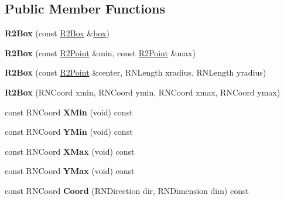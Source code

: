 \subsection*{Public Member Functions}
\begin{DoxyCompactItemize}
\item 
{\bfseries R2\+Box} (const \hyperlink{class_r2_box}{R2\+Box} \&\hyperlink{structbox}{box})\hypertarget{class_r2_box_a127e292224b01bcdce432230427a939a}{}\label{class_r2_box_a127e292224b01bcdce432230427a939a}

\item 
{\bfseries R2\+Box} (const \hyperlink{class_r2_point}{R2\+Point} \&min, const \hyperlink{class_r2_point}{R2\+Point} \&max)\hypertarget{class_r2_box_a83ae8c3cf4ee60fbb8fd9d979306aa6d}{}\label{class_r2_box_a83ae8c3cf4ee60fbb8fd9d979306aa6d}

\item 
{\bfseries R2\+Box} (const \hyperlink{class_r2_point}{R2\+Point} \&center, R\+N\+Length xradius, R\+N\+Length yradius)\hypertarget{class_r2_box_a3247ae91adcdfe432af88259093d426c}{}\label{class_r2_box_a3247ae91adcdfe432af88259093d426c}

\item 
{\bfseries R2\+Box} (R\+N\+Coord xmin, R\+N\+Coord ymin, R\+N\+Coord xmax, R\+N\+Coord ymax)\hypertarget{class_r2_box_a13d265b1f0d15d03edd856f89e083f3d}{}\label{class_r2_box_a13d265b1f0d15d03edd856f89e083f3d}

\item 
const R\+N\+Coord {\bfseries X\+Min} (void) const \hypertarget{class_r2_box_a82145070f2927859a1e5b8f25ce38094}{}\label{class_r2_box_a82145070f2927859a1e5b8f25ce38094}

\item 
const R\+N\+Coord {\bfseries Y\+Min} (void) const \hypertarget{class_r2_box_a8b9fec16e044ca636cba917dccf220c3}{}\label{class_r2_box_a8b9fec16e044ca636cba917dccf220c3}

\item 
const R\+N\+Coord {\bfseries X\+Max} (void) const \hypertarget{class_r2_box_af6dc0f420575381df0e3bc3a252200a6}{}\label{class_r2_box_af6dc0f420575381df0e3bc3a252200a6}

\item 
const R\+N\+Coord {\bfseries Y\+Max} (void) const \hypertarget{class_r2_box_a9d3a78db8f32542628656cbe2e16e1a8}{}\label{class_r2_box_a9d3a78db8f32542628656cbe2e16e1a8}

\item 
const R\+N\+Coord {\bfseries Coord} (R\+N\+Direction dir, R\+N\+Dimension dim) const \hypertarget{class_r2_box_a3a8b91e5e0c3ee943a9948dfafb56215}{}\label{class_r2_box_a3a8b91e5e0c3ee943a9948dfafb56215}


\end{DoxyCompactItemize}
